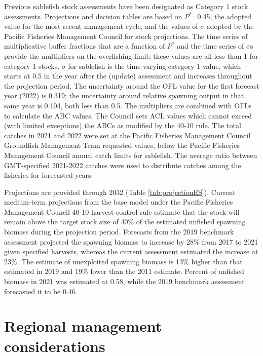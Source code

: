 \documentclass[11pt,
  english,
  a4paper,
]{article}
\begin{document}
Previous sablefish stock assessments have been designated as Category 1 stock assessments. Projections and decision tables are based on $P^*$=0.45, the adopted value for the most recent management cycle, and the values of $\sigma$ adopted by the Pacific Fisheries Management Council for stock projections. The time series of multiplicative buffer fractions that are a function of $P^*$ and the time series of $\sigma$s provide the multipliers on the overfishing limit; these values are all less than 1 for category 1 stocks. $\sigma$ for sablefish is the time-varying category 1 value, which starts at 0.5 in the year after the (update) assessment and increases throughout the projection period. The uncertainty around the OFL value for the first forecast year (2022) is 0.319; the uncertainty around relative spawning output in that same year is 0.104, both less than 0.5. The multipliers are combined with OFLs to calculate the ABC values. The Council sets ACL values which cannot exceed (with limited exceptions) the ABCs as modified by the 40-10 rule. The total catches in 2021 and 2022 were set at the Pacific Fisheries Management Council Groundfish Management Team requested values, below the Pacific Fisheries Management Council annual catch limits for sablefish. The average ratio between GMT-specified 2021-2022 catches were used to distribute catches among the fisheries for forecasted years.

Projections are provided through 2032 (Table \ref{tab:projectionES}). Current medium-term projections from the base model under the Pacific Fisheries Management Council 40-10 harvest control rule estimate that the stock will remain above the target stock size of 40\% of the estimated unfished spawning biomass during the projection period.  Forecasts from the 2019 benchmark assessment projected the spawning biomass to increase by 28\% from 2017 to 2021 given specified harvests, whereas the current assessment estimated the increase at 23\%. The estimate of unexploited spawning biomass is 13\% higher than that estimated in 2019 and 19\% lower than the 2011 estimate. Percent of unfished biomass in 2021 was estimated at 0.58, while the 2019 benchmark assessment forecasted it to be  0.46.


\hypertarget{regional-management-considerations}{%
\section{Regional management considerations}\label{regional-management-considerations}}
\end{document}
